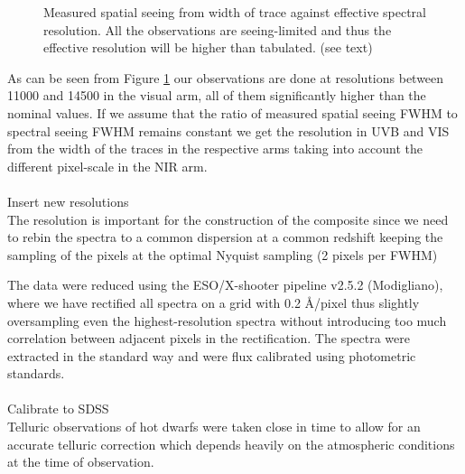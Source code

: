 \documentclass[iop]{emulateapj}
\begin{document}
\begin{figure}
\caption{Measured spatial seeing from width of trace against effective spectral resolution. All the observations are seeing-limited and thus the effective resolution will be higher than tabulated. (see text)\label{seeing}}
\end{figure}

As can be seen from Figure \ref{seeing} our observations are done at resolutions between 11000 and 14500 in the visual arm, all of them significantly higher than the nominal values. If we assume that the ratio of measured spatial seeing FWHM to spectral seeing FWHM remains constant we get the resolution in UVB and VIS from the width of the traces in the respective arms taking into account the different pixel-scale in the NIR arm.\\ \\
Insert new resolutions
\\

The resolution is important for the construction of the composite since we need to rebin the spectra to a common dispersion at a common redshift keeping the sampling of the pixels at the optimal Nyquist sampling (2 pixels per FWHM)

The data were reduced using the ESO/X-shooter pipeline v2.5.2 (Modigliano), where we have rectified all spectra on a grid with 0.2 \AA/pixel thus slightly oversampling even the highest-resolution spectra without introducing too much correlation between adjacent pixels in the rectification. The spectra were extracted in the standard way and were flux calibrated using photometric standards. \\ \\

Calibrate to SDSS \\


Telluric observations of hot dwarfs were taken close in time to allow for an accurate telluric correction which depends heavily on the atmospheric conditions at the time of observation.



\newcommand\sk[2]{Sk\,{$-#1{^\circ}#2$}}
\newcommand\tnc{\,\tablenotemark{c}}
\newcommand\tnd{\,\tablenotemark{d}}
\end{document}
